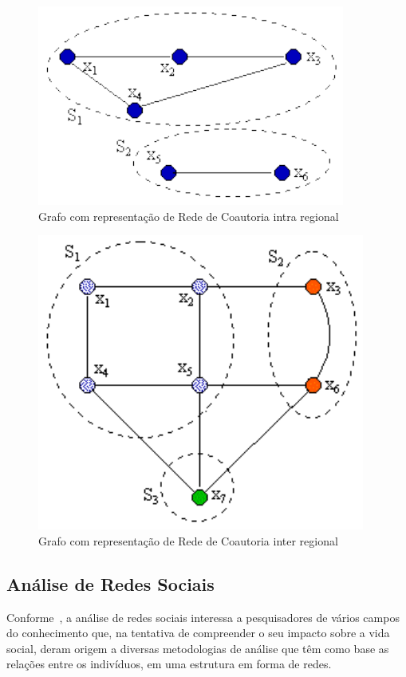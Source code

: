 \documentclass[12pt]{article}
\begin{document}
\begin{figure}[H]
\centering
\includegraphics[scale=0.8]{images/intra-grafo.pdf}
\caption{Grafo com representação de Rede de Coautoria intra regional}
\label{grafo1}
\end{figure}

\begin{figure}[H]
\centering
\includegraphics[scale=0.8]{images/inter-grafo.pdf}
\caption{Grafo com representação de Rede de Coautoria inter regional}
\label{grafo2}
\end{figure}

\subsection{Análise de Redes Sociais}

Conforme~\cite{Silva2006}, a análise de redes sociais interessa a pesquisadores de vários campos do conhecimento que, na tentativa de compreender o seu impacto sobre a vida social, deram origem a diversas metodologias de análise que têm como base as relações entre os indivíduos, em uma estrutura em forma de redes.
\end{document}
